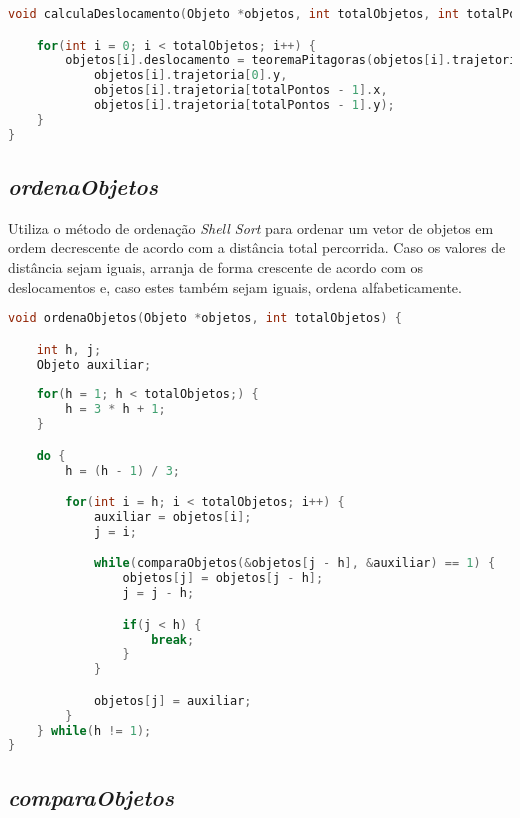 \documentclass{article}
\begin{document}
\begin{lstlisting}[label={lst:cod1},language=C]
void calculaDeslocamento(Objeto *objetos, int totalObjetos, int totalPontos) {

    for(int i = 0; i < totalObjetos; i++) {
        objetos[i].deslocamento = teoremaPitagoras(objetos[i].trajetoria[0].x,
            objetos[i].trajetoria[0].y,
            objetos[i].trajetoria[totalPontos - 1].x,
            objetos[i].trajetoria[totalPontos - 1].y);
    }
}
\end{lstlisting}


\subsection{\textit{ordenaObjetos}}

\hspace*{\parindent}Utiliza o método de ordenação \textit{Shell Sort} para ordenar um vetor de objetos em ordem decrescente de acordo com a distância total percorrida. Caso os valores de distância sejam iguais, arranja de forma crescente de acordo com os deslocamentos e, caso estes também sejam iguais, ordena alfabeticamente.

\begin{lstlisting}[label={lst:cod1},language=C]
void ordenaObjetos(Objeto *objetos, int totalObjetos) {

    int h, j;
    Objeto auxiliar;
	
    for(h = 1; h < totalObjetos;) {
        h = 3 * h + 1;
    }

    do {
        h = (h - 1) / 3;

        for(int i = h; i < totalObjetos; i++) {
            auxiliar = objetos[i];
            j = i;

            while(comparaObjetos(&objetos[j - h], &auxiliar) == 1) {
                objetos[j] = objetos[j - h];
                j = j - h;

                if(j < h) {
                    break;
                }
            }

            objetos[j] = auxiliar;
        }
    } while(h != 1);
}
\end{lstlisting}


\subsection{\textit{comparaObjetos}}
\end{document}

